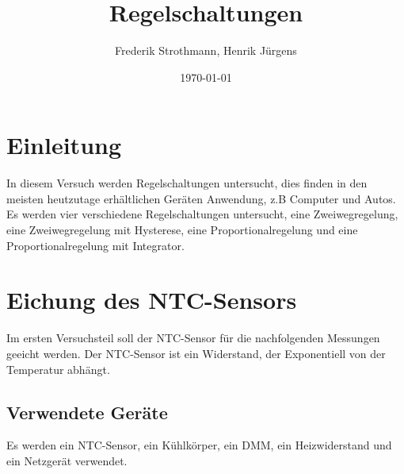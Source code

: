 \documentclass[12pt,a4paper]{article}
\title{Regelschaltungen}
\author{Frederik Strothmann, Henrik Jürgens}
\date{\today}
\begin{document}
\maketitle
\newpage
\tableofcontents
\newpage
\section{Einleitung}

In diesem Versuch werden Regelschaltungen untersucht, dies finden in den meisten heutzutage erhältlichen Geräten Anwendung, z.B Computer und Autos. Es werden vier verschiedene Regelschaltungen untersucht, eine Zweiwegregelung, eine Zweiwegregelung mit Hysterese, eine Proportionalregelung und eine Proportionalregelung mit Integrator.


\section{Eichung des NTC-Sensors}
Im ersten Versuchsteil soll der NTC-Sensor für die nachfolgenden Messungen geeicht werden. Der NTC-Sensor ist ein Widerstand, der Exponentiell von der Temperatur abhängt.

\subsection{Verwendete Geräte}

Es werden ein NTC-Sensor, ein Kühlkörper, ein DMM, ein Heizwiderstand und ein Netzgerät verwendet.
\end{document}
